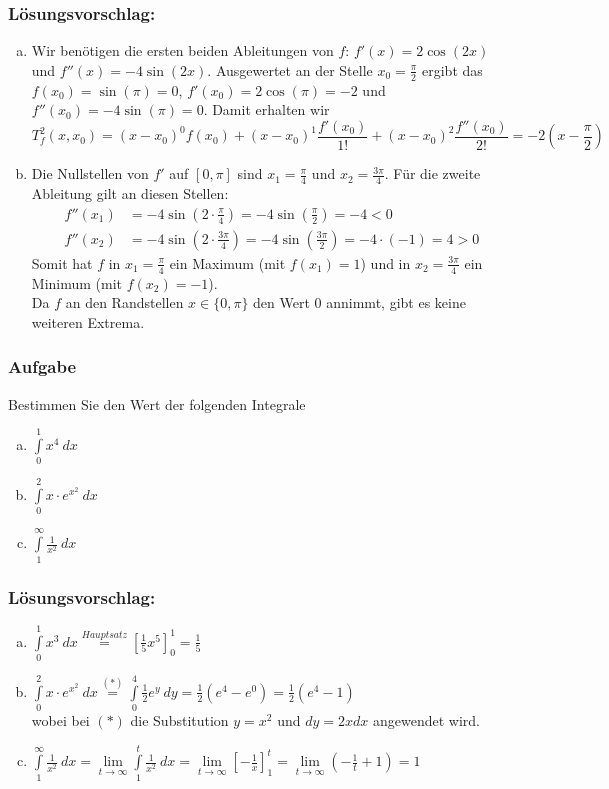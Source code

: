 \documentclass[a4paper,11pt]{scrartcl}
\newcounter{auf}
\newcommand{\Aufgabe}%
        {\addtocounter{auf}{1} \subsubsection*{\rmfamily  Aufgabe \theauf \hspace{1em}} }
\begin{document}
\subsubsection*{Lösungsvorschlag:}
\begin{enumerate}[a)]
\item Wir benötigen die ersten beiden Ableitungen von $f$: $f'(x)=2 \cos(2x)$ und $f''(x)=-4 \sin(2x)$. Ausgewertet an der Stelle $x_0=\frac{\pi}{2}$ ergibt das $f(x_0)=\sin(\pi)=0$, $f'(x_0)=2\cos(\pi)=-2$ und $f''(x_0)=-4\sin(\pi)=0$. Damit erhalten wir
$$
T^2_f(x,x_0)=(x-x_0)^0f(x_0)+(x-x_0)^1\frac{f'(x_0)}{1!} + (x-x_0)^2\frac{f''(x_0)}{2!}=-2(x-\frac{\pi}{2})
$$
\item Die Nullstellen von $f'$ auf $[0, \pi]$ sind $x_1=\frac{\pi}{4}$ und $x_2=\frac{3\pi}{4}$. Für die zweite Ableitung gilt an diesen Stellen:
\begin{align*}
f''(x_1)&=-4\sin(2\cdot \frac{\pi}{4})=-4 \sin(\frac{\pi}{2})=-4 <0\\
f''(x_2)&=-4\sin(2\cdot \frac{3\pi}{4})=-4 \sin(\frac{3\pi}{2})=-4 \cdot (-1)=4 >0
\end{align*}
Somit hat $f$ in $x_1=\frac{\pi}{4}$ ein Maximum (mit $f(x_1)=1$) und in $x_2=\frac{3\pi}{4}$ ein Minimum (mit $f(x_2)=-1$).\\
Da $f$ an den Randstellen $x \in \{0,\pi\}$ den Wert $0$ annimmt, gibt es keine weiteren Extrema.
\end{enumerate}

\newpage
\Aufgabe
Bestimmen Sie den Wert der folgenden Integrale
\begin{enumerate}[a)]
\item $\displaystyle\int \limits_{0}^1 x^4\ dx$
\item $\displaystyle\int \limits_{0}^2 x\cdot e^{x^2} \ dx$
\item $\displaystyle\int \limits_{1}^\infty \frac{1}{x^2}\ dx$
\end{enumerate}

\subsubsection*{Lösungsvorschlag:}

\begin{enumerate}[a)]
\item $\displaystyle\int \limits_{0}^1 x^3\ dx\stackrel{Hauptsatz}{=}\left[\frac{1}{5}x^5\right]_{0}^{1}=\frac{1}{5}$
 \item \quad$\displaystyle\int \limits_{0}^2 x\cdot e^{x^2} \ dx \stackrel{(*)}{=} \displaystyle\int \limits_0^4 \frac{1}{2}e^y \ dy= \frac{1}{2}(e^4-e^0)= \frac{1}{2}(e^4-1)$\\
wobei bei $(*)$ die Substitution $y=x^2$ und $dy=2xdx$ angewendet wird.
\item $\displaystyle\int \limits_{1}^\infty \frac{1}{x^2}\ dx = \lim \limits_{t \to \infty}\displaystyle\int \limits_{1}^t \frac{1}{x^2}\ dx = \lim \limits_{t \to \infty} \left[-\frac{1}{x}\right]_1^t= \lim \limits_{t \to \infty} \left(-\frac{1}{t}+1\right)=1$
\end{enumerate}
\end{document}
